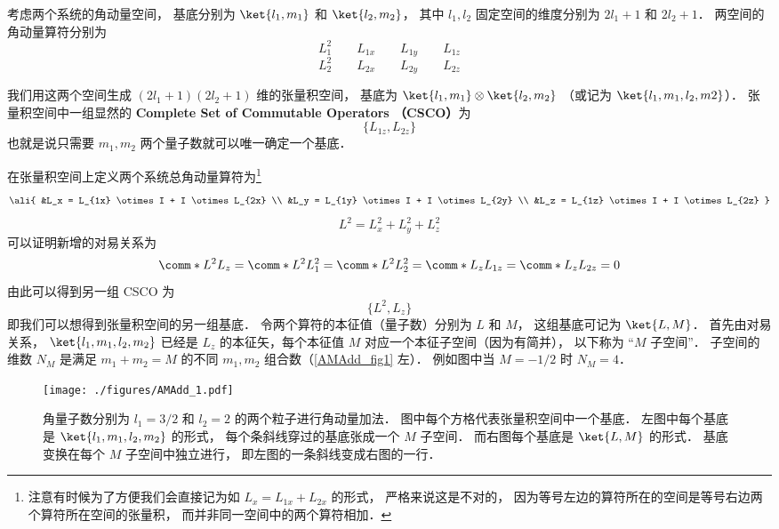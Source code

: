 

考虑两个系统的角动量空间， 基底分别为 $\ket{l_1, m_1}$ 和 $\ket{l_2, m_2}$， 其中 $l_1, l_2$ 固定空间的维度分别为 $2l_1+1$ 和 $2l_2+1$． 两空间的角动量算符分别为
\begin{equation}\label{AMAdd_eq1}
L_1^2 \qquad L_{1x} \qquad L_{1y} \qquad L_{1z}
\end{equation}
\begin{equation}
L_2^2 \qquad L_{2x} \qquad L_{2y} \qquad L_{2z}
\end{equation}

我们用这两个空间生成 $(2l_1+1)(2l_2+1)$ 维的张量积空间， 基底为 $\ket{l_1, m_1}\otimes\ket{l_2, m_2}$ （或记为 $\ket{l_1, m_1, l_2, m2}$）． 张量积空间中一组显然的 \textbf{Complete Set of Commutable Operators （CSCO）}为 %
\begin{equation}
\{L_{1z}, L_{2z}\}
\end{equation}
也就是说只需要 $m_1, m_2$ 两个量子数就可以唯一确定一个基底．

在张量积空间上定义两个系统总角动量算符为\footnote{注意有时候为了方便我们会直接记为如 $L_x = L_{1x} + L_{2x}$ 的形式， 严格来说这是不对的， 因为等号左边的算符所在的空间是等号右边两个算符所在空间的张量积， 而并非同一空间中的两个算符相加．}
\begin{equation}\ali{
&L_x = L_{1x} \otimes I +  I \otimes L_{2x} \\
&L_y = L_{1y} \otimes I +  I \otimes L_{2y} \\
&L_z = L_{1z} \otimes I +  I \otimes L_{2z}
}\end{equation}
\begin{equation}
L^2 = L_x^2 + L_y^2 + L_z^2
\end{equation}
可以证明新增的对易关系为
\begin{equation}
\comm*{L^2}{L_z} = \comm*{L^2}{L_1^2} = \comm*{L^2}{L_2^2} = 
\comm*{L_z}{L_{1z}} = \comm*{L_z}{L_{2z}} = 0
\end{equation}
由此可以得到另一组 CSCO 为 %
\begin{equation}
\{L^2, L_z\}
\end{equation}
即我们可以想得到张量积空间的另一组基底． 令两个算符的本征值（量子数）分别为 $L$  和 $M$， 这组基底可记为 $\ket{L, M}$．  首先由对易关系， $\ket{l_1, m_1, l_2, m_2}$ 已经是 $L_z$ 的本征矢，每个本征值 $M$ 对应一个本征子空间（因为有简并）， 以下称为 “$M$ 子空间”． 子空间的维数 $N_M$ 是满足 $m_1 + m_2 = M$ 的不同 $m_1,m_2$ 组合数（\autoref{AMAdd_fig1} 左）． 例如图中当 $M = -1/2$ 时 $N_M = 4$．
\begin{figure}[ht]
\centering
\texttt{[image: ./figures/AMAdd\_1.pdf]}
\caption{角量子数分别为 $l_1 = 3/2$ 和 $l_2 = 2$ 的两个粒子进行角动量加法． 图中每个方格代表张量积空间中一个基底． 左图中每个基底是 $\ket{l_1, m_1, l_2, m_2}$ 的形式， 每个条斜线穿过的基底张成一个 $M$ 子空间． 而右图每个基底是 $\ket{L, M}$ 的形式． 基底变换在每个 $M$ 子空间中独立进行， 即左图的一条斜线变成右图的一行．} \label{AMAdd_fig1}
\end{figure}

